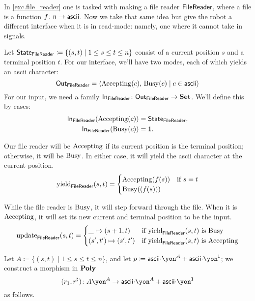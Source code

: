 \documentclass[Book-Poly]{subfiles}
\begin{document}
\begin{example}\label{ex.generalized_file_reader}
In \cref{exc.file_reader} one is tasked with making a file reader $\mathsf{FileReader}$, where a file is a function $f\colon\mathsf{n}\to\mathsf{ascii}$. Now we take that same idea but give the robot a different interface when it is in read-mode: namely, one where it cannot take in signals.

Let $\mathsf{State}_{\mathsf{FileReader}} \coloneqq \{(s,t)\mid 1\leq s\leq t\leq n\}$ consist of a
current position $s$ and a terminal position $t$. For our interface, we'll have
two modes, each of which yields an ascii character:
\[\mathsf{Out}_{\mathsf{FileReader}} = \langle \mathrm{Accepting}(c),\, \mathrm{Busy}(c) \mid c \in \mathsf{ascii} \rangle
\]
For our input, we need a family $\mathsf{In}_{\mathsf{FileReader}} \colon \mathsf{Out}_{\mathsf{FileReader}} \to \mathbf{Set}$.
We'll define this by cases:
\begin{align*}
  \mathsf{In}_{\mathsf{FileReader}}(\mathrm{Accepting}(c)) &= \mathsf{State}_{\mathsf{FileReader}}, \\
  \mathsf{In}_{\mathsf{FileReader}}(\mathrm{Busy}(c)) &= \mathsf{1}.
\end{align*}

Our file reader will be $\mathrm{Accepting}$ if its current position is the
terminal position; otherwise, it will be $\mathrm{Busy}$. In either case, it will
yield the ascii character at the current position.
\begin{align*}
  \mathrm{yield}_{\mathsf{FileReader}}(s, t) = \begin{cases} \mathrm{Accepting}(f(s)) &\mbox{if $s = t$}\\ \mathrm{Busy}((f(s)))  \end{cases}
\end{align*}

While the file reader is $\mathrm{Busy}$, it will step forward through the file.
When it is $\mathrm{Accepting}$, it will set its new current and terminal position
to be the input. 
\begin{align*}
  \mathrm{update}_{\mathsf{FileReader}}(s, t) = \begin{cases} \_ \mapsto (s + 1, t) &\mbox{if $\mathrm{yield}_{\mathsf{FileReader}}(s, t)$ is $\mathrm{Busy}$} \\ (s', t') \mapsto (s', t') &\mbox{if $\mathrm{yield}_{\mathsf{FileReader}}(s, t)$ is $\mathrm{Accepting}$}  \end{cases}
\end{align*}

Let $A\coloneqq\{(s,t)\mid 1\leq s\leq t\leq n\}$, and let $p\coloneqq \Set{ascii}\mdot\yon^A+\Set{ascii}\mdot\yon^\1$; we construct a morphism in $\mathbf{Poly}$
\[
(r_1,r^\sharp)\colon A\yon^A\to \Set{ascii}\mdot\yon^A+\Set{ascii}\mdot\yon^\1
\]
as follows.


\end{example}
\end{document}
